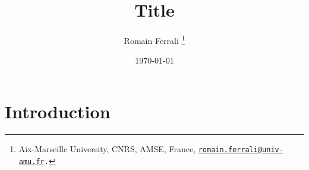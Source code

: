 \documentclass[11pt]{article}
\title{
    Title
}
\author{
    Romain Ferrali
    \thanks{
        Aix-Marseille University, CNRS, AMSE, France, {\tt \href{mailto:romain.ferrali@univ-amu.fr}{romain.ferrali@univ-amu.fr}.}
    }
}
\date{\today}
\theoremstyle{definition}
\theoremstyle{remark}
\begin{document}
\sloppy %

\if{}
    \maketitle
        
\fi

\section{Introduction}

\newpage
%  
% 

\newpage

\end{document}

